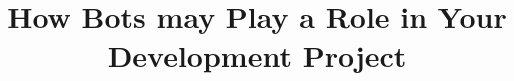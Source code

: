 \documentclass{sig-alternate}
\begin{document}
%

\title{How Bots may Play a Role in Your Development Project}




%
%
%
%
%
\end{document}
